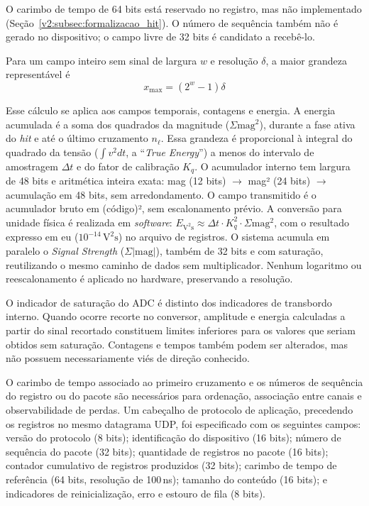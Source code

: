 O carimbo de tempo de 64 bits está reservado no registro, mas não implementado (Seção~\ref{v2:subsec:formalizacao_hit}). O número de sequência também não é gerado no dispositivo; o campo livre de 32 bits é candidato a recebê-lo.

Para um campo inteiro sem sinal de largura \(w\) e resolução \(\delta\), a maior grandeza representável é
\begin{equation}
	x_{\max} = \left(2^w-1\right)\delta
	\label{v2:eq:faixa_campo_registro}
\end{equation}

Esse cálculo se aplica aos campos temporais, contagens e energia. A energia acumulada é a soma dos quadrados da magnitude (\(\Sigma \text{mag}^2\)), durante a fase ativa do \textit{hit} e até o último cruzamento \(n_\ell\). Essa grandeza é proporcional à integral do quadrado da tensão (\(\int v^2 dt\), a ``\textit{True Energy}'') a menos do intervalo de amostragem \(\Delta t\) e do fator de calibração \(K_q\). O acumulador interno tem largura de 48 bits e aritmética inteira exata: mag (12 bits) \(\rightarrow\) mag² (24 bits) \(\rightarrow\) acumulação em 48 bits, sem arredondamento. O campo transmitido é o acumulador bruto em (código)², sem escalonamento prévio. A conversão para unidade física é realizada em \textit{software}: \(E_{\mathrm{V^2s}} \approx \Delta t \cdot K_q^2 \cdot \Sigma \text{mag}^2\), com o resultado expresso em eu (\(10^{-14}\,\mathrm{V^2s}\)) no arquivo de registros. O sistema acumula em paralelo o \textit{Signal Strength} (\(\Sigma |\text{mag}|\)), também de 32 bits e com saturação, reutilizando o mesmo caminho de dados sem multiplicador. Nenhum logaritmo ou reescalonamento é aplicado no hardware, preservando a resolução.

O indicador de saturação do ADC é distinto dos indicadores de transbordo interno. Quando ocorre recorte no conversor, amplitude e energia calculadas a partir do sinal recortado constituem limites inferiores para os valores que seriam obtidos sem saturação. Contagens e tempos também podem ser alterados, mas não possuem necessariamente viés de direção conhecido.

O carimbo de tempo associado ao primeiro cruzamento e os números de sequência do registro ou do pacote são necessários para ordenação, associação entre canais e observabilidade de perdas. Um cabeçalho de protocolo de aplicação, precedendo os registros no mesmo datagrama UDP, foi especificado com os seguintes campos: versão do protocolo (8 bits); identificação do dispositivo (16 bits); número de sequência do pacote (32 bits); quantidade de registros no pacote (16 bits); contador cumulativo de registros produzidos (32 bits); carimbo de tempo de referência (64 bits, resolução de 100\,ns); tamanho do conteúdo (16 bits); e indicadores de reinicialização, erro e estouro de fila (8 bits).

